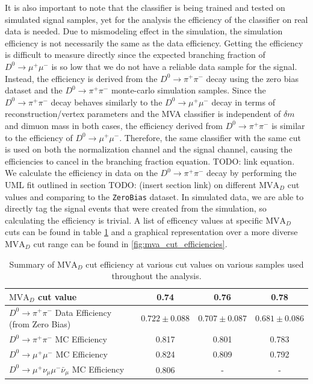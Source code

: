 It is also important to note that the classifier is being trained and tested on simulated signal samples, yet for the analysis the efficiency of the classifier on real data is needed. Due to mismodeling effect in the simulation, the simulation efficiency is not necessarily the same as the data efficiency. Getting the efficiency is difficult to measure directly since the expected branching fraction of $D^0 \to \mu^+ \mu^-$ is so low that we do not have a reliable data sample for the signal. Instead, the efficiency is derived from the $D^0 \to \pi^+ \pi^-$ decay using the zero bias dataset and the $D^0 \to \pi^+ \pi^-$ monte-carlo simulation samples. Since the $D^0 \to \pi^+ \pi^-$ decay behaves similarly to the $D^0 \to \mu^+ \mu^-$ decay in terms of reconstruction/vertex parameters and the MVA classifier is independent of $\delta m$ and dimuon mass in both cases, the efficiency derived from $D^0 \to \pi^+ \pi^-$ is similar to the efficiency of $D^0 \to \mu^+ \mu^-$. Therefore, the same classifier with the same cut is used on both the normalization channel and the signal channel, causing the efficiencies to cancel in the branching fraction equation. TODO: link equation. We calculate the efficiency in data on the $D^0 \to \pi^+ \pi^-$ decay by performing the UML fit outlined in section TODO: (insert section link) on different $\text{MVA}_D$ cut values and comparing to the \texttt{ZeroBias} dataset. In simulated data, we are able to directly tag the signal events that were created from the simulation, so calculating the efficiency is trivial. A list of efficency values at specific $\text{MVA}_D$ cuts can be found in table \ref{tab:mva_cut_efficiencies} and a graphical representation over a more diverse $\text{MVA}_D$ cut range can be found in \ref{fig:mva_cut_efficiencies}.

\begin{table}[htbp]
    \centering
    \begin{tabular}{|l|c|c|c|}
    \hline
    $\text{MVA}_D$ cut value & \textbf{0.74} & \textbf{0.76} & \textbf{0.78} \\
    \hline
    $D^0 \to \pi^+ \pi^-$ Data Efficiency (from Zero Bias) & $0.722 \pm 0.088$ & $0.707 \pm 0.087$ & $0.681 \pm 0.086$ \\
    $D^0 \to \pi^+ \pi^-$ MC Efficiency & 0.817 & 0.801 & 0.783 \\
    $D^0 \to \mu^+ \mu^-$ MC Efficiency & 0.824 & 0.809 & 0.792 \\
    $D^0 \to \mu^+\nu_\mu\mu^-\bar{\nu}_\mu$ MC Efficiency & 0.806 & - & - \\
    \hline
    \end{tabular}
    \caption{Summary of $\text{MVA}_D$ cut efficiency at various cut values on various samples used throughout the analysis.}
    \label{tab:mva_cut_efficiencies}
\end{table}

